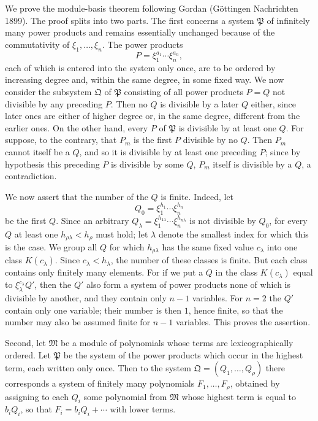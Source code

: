 \documentclass[11pt]{article}
\newcommand{\mM}{\mathfrak{M}}
\newcommand{\mP}{\mathfrak{P}}
\newcommand{\mQ}{\mathfrak{Q}}
\begin{document}
We prove the module-basis theorem following Gordan (Göttingen Nachrichten 1899). The proof splits into two parts. The first concerns a system $\mP$ of infinitely many power products and remains essentially unchanged because of the commutativity of $\xi_1,
\ldots,\xi_n$. The power products
\[
 P=\xi_1^{a_1}\cdots\xi_n^{a_n},
\]
each of which is entered into the system only once, are to be ordered by increasing degree and, within the same degree, in some fixed way. We now consider the subsystem $\mQ$ of $\mP$ consisting of all power products $P=Q$ not divisible by any preceding $P$. Then no $Q$ is divisible by a later $Q$ either, since later ones are either of higher degree or, in the same degree, different from the earlier ones. On the other hand, every $P$ of $\mP$ is divisible by at least one $Q$. For suppose, to the contrary, that $P_m$ is the first $P$ divisible by no $Q$. Then $P_m$ cannot itself be a $Q$, and so it is divisible by at least one preceding $P$; since by hypothesis this preceding $P$ is divisible by some $Q$, $P_m$ itself is divisible by a $Q$, a contradiction.

We now assert that the number of the $Q$ is finite. Indeed, let
\[
 Q_0=\xi_1^{h_1}\cdots\xi_n^{h_n}
\]
be the first $Q$. Since an arbitrary $Q_\lambda=\xi_1^{h_{1\lambda}}\cdots\xi_n^{h_{n\lambda}}$ is not divisible by $Q_0$, for every $Q$ at least one $h_{\rho\lambda}<h_\rho$ must hold; let $\lambda$ denote the smallest index for which this is the case. We group all $Q$ for which $h_{\rho\lambda}$ has the same fixed value $c_\lambda$ into one class $K(c_\lambda)$. Since $c_\lambda<h_\lambda$, the number of these classes is finite. But each class contains only finitely many elements. For if we put a $Q$ in the class $K(c_\lambda)$ equal to $\xi_\lambda^{c_\lambda}Q'$, then the $Q'$ also form a system of power products none of which is divisible by another, and they contain only $n-1$ variables. For $n=2$ the $Q'$ contain only one variable; their number is then $1$, hence finite, so that the number may also be assumed finite for $n-1$ variables. This proves the assertion.

Second, let $\mM$ be a module of polynomials whose terms are lexicographically ordered. Let $\mP$ be the system of the power products which occur in the highest term, each written only once. Then to the system $\mQ=(Q_1,
\ldots,Q_\rho)$ there corresponds a system of finitely many polynomials $F_1,
\ldots,F_\rho$, obtained by assigning to each $Q_i$ some polynomial from $\mM$ whose highest term is equal to $b_iQ_i$, so that $F_i=b_iQ_i+
\cdots$ with lower terms.
\end{document}
